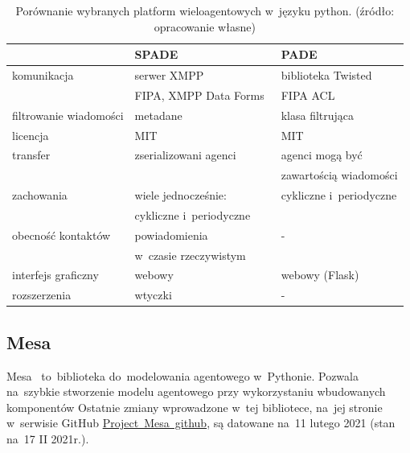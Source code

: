 \documentclass[11pt]{report}
\begin{document}
    \begin{table}[tbp]
        \begin{tabular}{l|ll}
            & SPADE                                   & PADE                     \\ \hline
            komunikacja            & serwer XMPP                             & biblioteka Twisted       \\
            & FIPA, XMPP Data Forms~\cite{data_forms} & FIPA ACL~\cite{fipa_acl} \\ \hline
            filtrowanie wiadomości & metadane                                & klasa filtrująca         \\ \hline
            licencja               & MIT                                     & MIT                      \\ \hline
            transfer               & zserializowani agenci                   & agenci mogą być          \\
            &                                         & zawartością wiadomości   \\ \hline
            zachowania             & wiele jednocześnie:                     & cykliczne i~periodyczne  \\
            & cykliczne i~periodyczne \\ \hline
            obecność kontaktów     & powiadomienia                           & -                        \\
            & w~czasie rzeczywistym \\ \hline
            interfejs graficzny    & webowy                                  & webowy (Flask)           \\ \hline
            rozszerzenia           & wtyczki                                 & -                        \\ \hline \hline
        \end{tabular}
        \caption{Porównanie wybranych platform wieloagentowych w~języku python. (źródło: opracowanie własne)}
        \label{tab:porownanie}
    \end{table}

    \subsection{Mesa}
    Mesa~\cite{Masad2015} to~biblioteka do~modelowania agentowego w~Pythonie.
    Pozwala na~szybkie stworzenie modelu agentowego przy wykorzystaniu wbudowanych komponentów
    Ostatnie zmiany wprowadzone w~tej bibliotece, na~jej stronie w~serwisie GitHub \href{https://github.com/projectmesa/mesa}{Project~Mesa~github}, są datowane na~11 lutego 2021 (stan na~17 II 2021r.).
\end{document}
